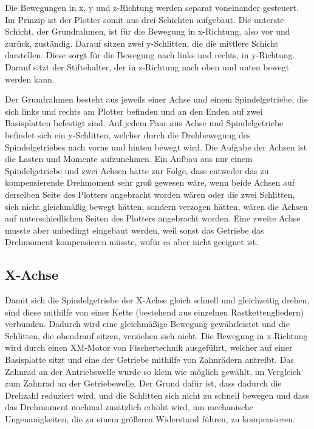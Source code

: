 \documentclass[conference,compsoc,final,a4paper]{IEEEtran}
\begin{document}
Die Bewegungen in x, y und z-Richtung werden separat voneinander gesteuert. Im Prinzip ist der Plotter somit aus drei Schichten
aufgebaut. Die unterste Schicht, der Grundrahmen, ist für die Bewegung in x-Richtung, also vor und zurück, zuständig. Darauf
sitzen zwei y-Schlitten, die die mittlere Schicht darstellen. Diese sorgt für die Bewegung nach links und rechts, in y-Richtung.
Darauf sitzt der Stiftehalter, der in z-Richtung nach oben und unten bewegt werden kann.

Der Grundrahmen besteht aus jeweils einer Achse und einem Spindelgetriebe, die sich links und rechts am Plotter befinden und an
den Enden auf zwei Basisplatten befestigt sind. Auf jedem Paar aus Achse und Spindelgetriebe befindet sich ein y-Schlitten, welcher
durch die Drehbewegung des Spindelgetriebes nach vorne und hinten bewegt wird. Die Aufgabe der Achsen ist die Lasten und Momente
aufzunehmen. Ein Aufbau aus nur einem Spindelgetriebe und zwei Achsen hätte zur Folge, dass entweder das zu kompensierende Drehmoment
sehr groß gewesen wäre, wenn beide Achsen auf derselben Seite des Plotters angebracht worden wären oder die zwei Schlitten, sich nicht
gleichmäßig bewegt hätten, sondern verzogen hätten, wären die Achsen auf unterschiedlichen Seiten des Plotters angebracht worden.
Eine zweite Achse musste aber unbedingt eingebaut werden, weil sonst das Getriebe das Drehmoment kompensieren müsste, wofür es aber
nicht geeignet ist.

\subsection{X-Achse}

Damit sich die Spindelgetriebe der X-Achse gleich schnell und gleichzeitig drehen, sind diese mithilfe von einer Kette (bestehend aus einzelnen
Rastkettengliedern) verbunden. Dadurch wird eine gleichmäßige Bewegung gewährleistet und die Schlitten, die obendrauf sitzen,
verziehen sich nicht. Die Bewegung in x-Richtung wird durch einen XM-Motor von Fischertechnik ausgeführt, welcher auf einer
Basisplatte sitzt und eine der Getriebe mithilfe von Zahnrädern antreibt. Das Zahnrad an der Antriebswelle wurde so klein wie möglich
gewählt, im Vergleich zum Zahnrad an der Getriebewelle. Der Grund dafür ist, dass dadurch die Drehzahl reduziert wird, und die Schlitten
sich nicht zu schnell bewegen und dass das Drehmoment nochmal zusätzlich erhöht wird, um mechanische Ungenauigkeiten, die zu einem
größeren Widerstand führen, zu kompensieren. 
\end{document}
